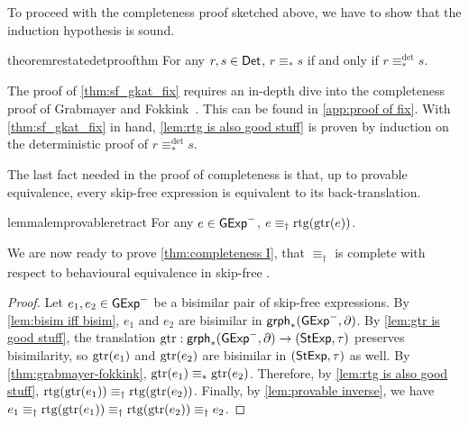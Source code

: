 \documentclass[orivec,envcountsect,envcountsame]{llncs}
\begin{document}
To proceed with the completeness proof sketched above, we have to show that the induction hypothesis is sound.

%

\begin{restatable}{theorem}{restatedetproofthm}\label{thm:sf_gkat_fix}
    For any \(r,s \in \mathsf{Det}\), \(r \equiv_* s\) if and only if \(r \equiv_*^{\det} s\).
\end{restatable}

The proof of \cref{thm:sf_gkat_fix} requires an in-depth dive into the completeness proof of Grabmayer and Fokkink~\cite{onefreeregexlics}.
This can be found in \cref{app:proof of fix}.
With \cref{thm:sf_gkat_fix} in hand, \cref{lem:rtg is also good stuff} is proven by induction on the deterministic proof of \(r \equiv_*^{\det} s\).


The last fact needed in the proof of completeness is that, up to provable equivalence, every skip-free  \GKAT expression is equivalent to its back-translation.

\begin{restatable}{lemma}{lemprovableretract}\label{lem:provable inverse}
    For any \(e \in \mathsf{GExp}^-\), \(e \equiv_\dagger \operatorname{rtg}(\operatorname{gtr}(e))\).
\end{restatable}

We are now ready to prove \cref{thm:completeness I}, that $\equiv_\dagger$ is complete with respect to behavioural equivalence in skip-free  \GKAT. %

\restatecompletenessone*
\begin{proof}
    Let \(e_1,e_2 \in \mathsf{GExp}^-\) be a bisimilar pair of skip-free  \GKAT expressions.
    By \cref{lem:bisim iff bisim}, \(e_1\) and \(e_2\) are bisimilar in \(\mathsf{grph}_*(\mathsf{GExp}^-, \partial)\).
    By \cref{lem:gtr is good stuff}, the translation \(\operatorname{gtr} : \mathsf{grph}_*(\mathsf{GExp}^-, \partial) \to (\mathsf{StExp}, \tau)\) preserves bisimilarity, so \(\operatorname{gtr}(e_1)\) and \(\operatorname{gtr}(e_2)\) are bisimilar in \((\mathsf{StExp}, \tau)\) as well.
    By \cref{thm:grabmayer-fokkink}, \(\operatorname{gtr}(e_1) \equiv_* \operatorname{gtr}(e_2)\).
    Therefore, by \cref{lem:rtg is also good stuff}, \(\operatorname{rtg}(\operatorname{gtr}(e_1)) \equiv_\dagger \operatorname{rtg}(\operatorname{gtr}(e_2))\).
    Finally, by \cref{lem:provable inverse}, we have
    \(
        e_1 \equiv_\dagger \operatorname{rtg}(\operatorname{gtr}(e_1)) \equiv_\dagger \operatorname{rtg}(\operatorname{gtr}(e_2)) \equiv_\dagger e_2
    \).
\end{proof}
\end{document}

